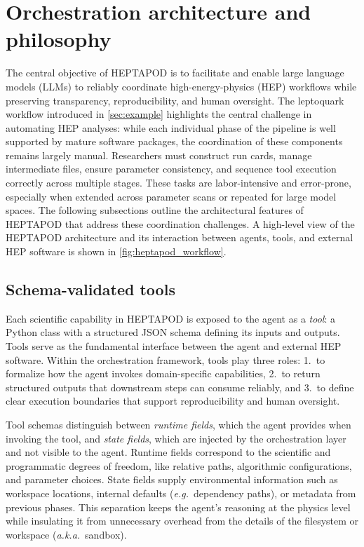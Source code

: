 \documentclass[11pt,oneside]{article}
\numberwithin{equation}{section}
\newcommand{\pkgname}{HEPTAPOD\xspace}
\begin{document}
\section{Orchestration architecture and philosophy}
\label{sec:architecture}

The central objective of \pkgname is to facilitate and enable large language models (LLMs) to reliably coordinate high-energy-physics (HEP) workflows while preserving transparency, reproducibility, and human oversight. 
The leptoquark workflow introduced in \cref{sec:example} highlights the central challenge in automating HEP analyses: while each individual phase of the pipeline is well supported by mature software packages, the coordination of these components remains largely manual. 
Researchers must construct run cards, manage intermediate files, ensure parameter consistency, and sequence tool execution correctly across multiple stages. 
These tasks are labor-intensive and error-prone, especially when extended across parameter scans or repeated for large model spaces.
The following subsections outline the architectural features of \pkgname that address these coordination challenges. 
A high-level view of the HEPTAPOD architecture and its interaction between agents, tools, and external HEP software is shown in \cref{fig:heptapod_workflow}.

\subsection{Schema-validated tools}
\label{subsec:schematools}

Each scientific capability in \pkgname is exposed to the agent as a \emph{tool}: a Python class with a structured JSON schema defining its inputs and outputs.
Tools serve as the fundamental interface between the agent and external HEP software. 
Within the orchestration framework, tools play three roles: 1.~to formalize how the agent invokes domain-specific capabilities, 2.~to return structured outputs that downstream steps can consume reliably, and 3.~to define clear execution boundaries that support reproducibility and human oversight. 

Tool schemas distinguish between \emph{runtime fields}, which the agent provides when invoking the tool, and \emph{state fields}, which are injected by the orchestration layer and not visible to the agent. 
Runtime fields correspond to the scientific and programmatic degrees of freedom, like relative paths, algorithmic configurations, and parameter choices. 
State fields supply environmental information such as workspace locations, internal defaults (\textit{e.g.}~dependency paths), or metadata from previous phases.
This separation keeps the agent's reasoning at the physics level while insulating it from unnecessary overhead from the details of the filesystem or workspace (\textit{a.k.a.}~sandbox).
\end{document}
